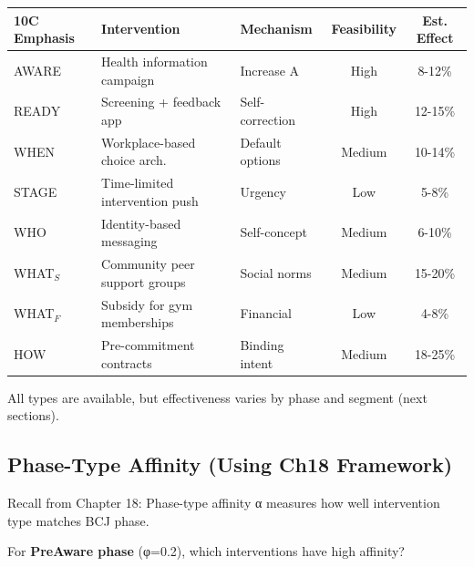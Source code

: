 \begin{center}
\begin{tabular}{@{}lllcc@{}}
\toprule
\textbf{10C Emphasis} & \textbf{Intervention} & \textbf{Mechanism} & \textbf{Feasibility} & \textbf{Est. Effect} \\
\midrule
AWARE & Health information campaign & Increase A & High & 8-12\% \\
READY & Screening + feedback app & Self-correction & High & 12-15\% \\
WHEN & Workplace-based choice arch. & Default options & Medium & 10-14\% \\
STAGE & Time-limited intervention push & Urgency & Low & 5-8\% \\
WHO & Identity-based messaging & Self-concept & Medium & 6-10\% \\
WHAT$_S$ & Community peer support groups & Social norms & Medium & 15-20\% \\
WHAT$_F$ & Subsidy for gym memberships & Financial & Low & 4-8\% \\
HOW & Pre-commitment contracts & Binding intent & Medium & 18-25\% \\
\midrule
\end{tabular}
\end{center}

All types are available, but effectiveness varies by phase and segment (next sections).

\subsection{Phase-Type Affinity (Using Ch18 Framework)}

Recall from Chapter 18: Phase-type affinity α measures how well intervention type matches BCJ phase.

For \textbf{PreAware phase} (φ=0.2), which interventions have high affinity?

